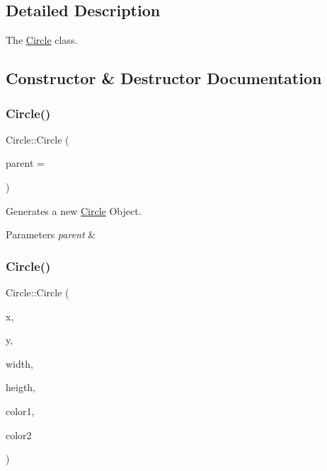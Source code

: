 \subsection{Detailed Description}
The \hyperlink{class_circle}{Circle} class. 

\subsection{Constructor \& Destructor Documentation}
\mbox{\label{class_circle_a4dca54ed7e68a3cd4b4836deaa5ecea1}} 
\subsubsection{\texorpdfstring{Circle()}{Circle()}\hspace{0.1cm}{\footnotesize\ttfamily [1/2]}}
{\footnotesize\ttfamily Circle\+::\+Circle (\begin{DoxyParamCaption}\item[{Q\+Object $\ast$}]{parent = {} }\end{DoxyParamCaption})\hspace{0.3cm}{\ttfamily [explicit]}}



Generates a new \hyperlink{class_circle}{Circle} Object. 


\begin{DoxyParams}{Parameters}
{\em parent} & \\
\hline
\end{DoxyParams}
\mbox{\label{class_circle_a6c99dec4ddc0c9c289d4beaf2c4f9a9e}} 
\subsubsection{\texorpdfstring{Circle()}{Circle()}\hspace{0.1cm}{\footnotesize\ttfamily [2/2]}}
{\footnotesize\ttfamily Circle\+::\+Circle (\begin{DoxyParamCaption}\item[{qreal}]{x,  }\item[{qreal}]{y,  }\item[{qreal}]{width,  }\item[{qreal}]{heigth,  }\item[{Q\+Color}]{color1,  }\item[{Q\+Color}]{color2 }\end{DoxyParamCaption})}




